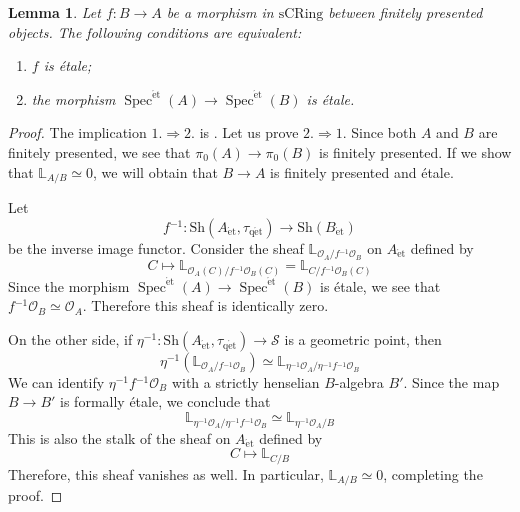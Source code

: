 \documentclass[12pt,a4paper,reqno]{amsart}
\theoremstyle{plain}
\newtheorem{lem}[thm]{Lemma}
\theoremstyle{definition}
\theoremstyle{remark}
\numberwithin{equation}{section}
\begin{document}
\begin{lem} \label{lem:topos_theoretic_etale}
	Let $f \colon B \to A$ be a morphism in $\mathrm{sCRing}$ between finitely presented objects.
	The following conditions are equivalent:
	\begin{enumerate}
		\item $f$ is \'etale;
		\item the morphism $\operatorname{Spec}^{\mathrm{\acute{e}t}}(A) \to \operatorname{Spec}^{\mathrm{\acute{e}t}}(B)$ is \'etale.
	\end{enumerate}
\end{lem}

\begin{proof}
	{\ignorespaces}
	The implication $1. \Rightarrow 2.$ is \cite[Example 2.3.8]{DAG-V}.
	Let us prove $2. \Rightarrow 1.$
	Since both $A$ and $B$ are finitely presented, we see that $\pi_0(A) \to \pi_0(B)$ is finitely presented.
	If we show that $\mathbb L_{A / B} \simeq 0$, we will obtain that $B \to A$ is finitely presented and \'etale.
	
	Let
	\[ f{^{-1}} \colon {\mathrm{Sh}}(A_{\mathrm{\acute{e}t}}, {\tau_\mathrm{q\acute{e}t}}) \to {\mathrm{Sh}}(B_{\mathrm{\acute{e}t}}) \]
	be the inverse image functor.
	Consider the sheaf $\mathbb L_{{\mathcal O}_A / f{^{-1}} {\mathcal O}_B}$ on $A_{\mathrm{\acute{e}t}}$ defined by
	\[ C \mapsto \mathbb L_{{\mathcal O}_A(C) / f{^{-1}} {\mathcal O}_B(C)} = \mathbb L_{C / f{^{-1}} {\mathcal O}_B(C)} \]
	Since the morphism $\operatorname{Spec}^{\mathrm{\acute{e}t}}(A) \to \operatorname{Spec}^{\mathrm{\acute{e}t}}(B)$ is \'etale, we see that $f{^{-1}} {\mathcal O}_B \simeq {\mathcal O}_A$.
	Therefore this sheaf is identically zero.
	
	On the other side, if $\eta{^{-1}} \colon {\mathrm{Sh}}(A_{\mathrm{\acute{e}t}}, {\tau_\mathrm{q\acute{e}t}}) \to {\mathcal S}$ is a geometric point, then
	\[ \eta{^{-1}}(\mathbb L_{{\mathcal O}_A / f{^{-1}} {\mathcal O}_B}) \simeq \mathbb L_{\eta{^{-1}} {\mathcal O}_A / \eta{^{-1}} f{^{-1}} {\mathcal O}_B} \]
	We can identify $\eta{^{-1}} f{^{-1}} {\mathcal O}_B$ with a strictly henselian $B$-algebra $B'$.
	Since the map $B \to B'$ is formally \'etale, we conclude that
	\[ \mathbb L_{\eta{^{-1}} {\mathcal O}_A / \eta{^{-1}} f{^{-1}} {\mathcal O}_B} \simeq \mathbb L_{\eta{^{-1}} {\mathcal O}_A / B} \]
	This is also the stalk of the sheaf on $A_{\mathrm{\acute{e}t}}$ defined by
	\[ C \mapsto \mathbb L_{C / B} \]
	Therefore, this sheaf vanishes as well. In particular, $\mathbb L_{A / B} \simeq 0$, completing the proof.
\end{proof}
\end{document}
